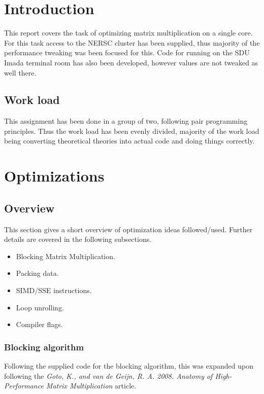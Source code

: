 \documentclass[a4paper,11pt,oneside]{book}
\begin{document}
\renewcommand{\contentsname}{Table of Contents}
\tableofcontents
\thispagestyle{empty}

\pagestyle{ruled}
\chapter{Introduction}
\setcounter{section}{1}
This report covers the task of optimizing matrix multiplication on a single core. For this task access to the NERSC cluster has been supplied, thus majority of the performance tweaking was been focused for this. Code for running on the SDU Imada terminal room has also been developed, however values are not tweaked as well there.

\section{Work load}
This assignment has been done in a group of two, following pair programming principles. Thus the work load has been evenly divided, majority of the work load being converting theoretical theories into actual code and doing things correctly.


\chapter{Optimizations}
\section{Overview}
This section gives a short overview of optimization ideas followed/used. Further details are covered in the following subsections.

\begin{itemize}
\item Blocking Matrix Multiplication.
\item Packing data.
\item SIMD/SSE instructions.
\item Loop unrolling.
\item Compiler flags.
\end{itemize}

\subsection{Blocking algorithm}
Following the supplied code for the blocking algorithm, this was expanded upon following the \emph{Goto, K., and van de Geijn, R. A. 2008. Anatomy of High-Performance Matrix Multiplication} article.
\end{document}
